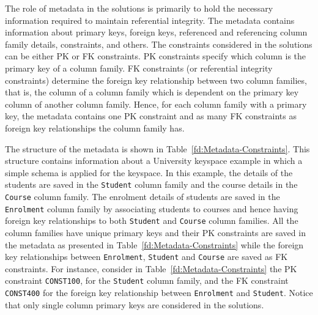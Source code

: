 The role of metadata in  the solutions is primarily to hold the necessary
 information required to maintain referential integrity. The metadata contains
 information about primary keys,   foreign keys,  referenced and referencing
 column family details, constraints, and others.  The constraints considered in
 the solutions can be either \ac{PK} or \ac{FK} constraints. \ac{PK} constraints
 specify which column is the primary key of a column family. \ac{FK} constraints
 (or referential integrity constraints) determine the foreign key relationship
 between two column families, that is, the column of a column family which  is
 dependent on the primary key  column of another column family.  Hence, for each
 column family with a primary key,  the metadata  contains one \ac{PK}
 constraint  and  as many \ac{FK} constraints as foreign key relationships the
 column family has.

The structure of the metadata is shown in Table~\ref{fd:Metadata-Constraints}.
This structure contains information about a University keyspace example in which
 a simple schema is applied for the keyspace. In this example,  the details of
the students are saved in  the \texttt{Student} column family and the course
 details in the \texttt{Course} column family.  The enrolment details of
 students are saved in the \texttt{Enrolment} column family by associating
 students to courses and hence having foreign key relationships to both
 \texttt{Student} and \texttt{Course} column families. All the column families
 have unique primary keys and their \ac{PK} constraints are saved in the
 metadata as presented in Table~\ref{fd:Metadata-Constraints} while the foreign
 key relationships between \texttt{Enrolment}, \texttt{Student} and \texttt{Course} are saved as \ac{FK} constraints.  For instance, consider in
 Table~\ref{fd:Metadata-Constraints} the \ac{PK} constraint \texttt{CONST100},
 for the \texttt{Student} column family, and the \ac{FK} constraint
 \texttt{CONST400} for the foreign key relationship between
\texttt{Enrolment} and \texttt{Student}. Notice that only
 single column primary keys are considered in the solutions.

